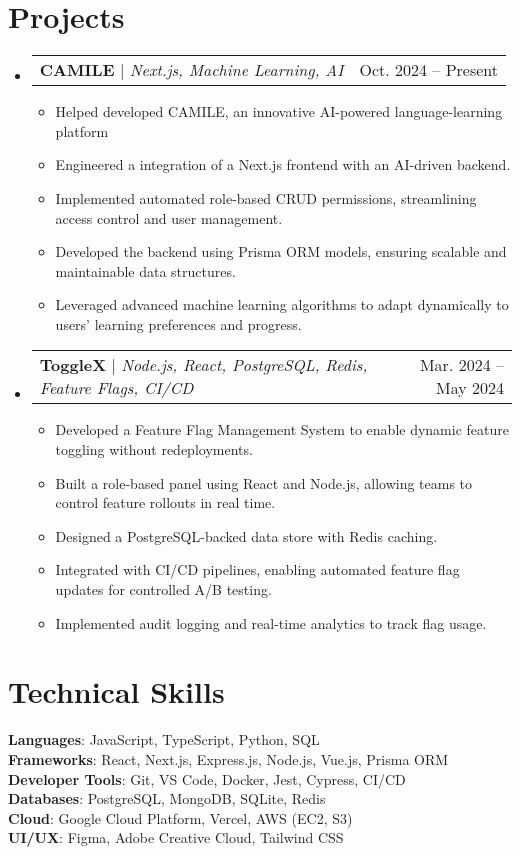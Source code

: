 \documentclass[letterpaper,11pt]{article}
\makeatletter
\newcommand{\resumeItem}[1]{
  \item\small{
    {#1 \vspace{-2pt}}
  }
}
\newcommand{\resumeProjectHeading}[2]{
    \item
    \begin{tabular*}{0.97\textwidth}{l@{\extracolsep{\fill}}r}
      \small#1 & #2 \\
    \end{tabular*}\vspace{-7pt}
}
\newcommand{\resumeItemListStart}{\begin{itemize}}
\newcommand{\resumeItemListEnd}{\end{itemize}\vspace{-5pt}}
\makeatother
\begin{document}
\section{Projects}
  \begin{itemize}[leftmargin=0.15in, label={}]
\resumeProjectHeading
  {\textbf{CAMILE} $|$ \emph{Next.js, Machine Learning, AI}}{Oct. 2024 -- Present}
  \resumeItemListStart
    \resumeItem{Helped developed CAMILE, an innovative AI-powered language-learning platform}
    \resumeItem{Engineered a integration of a Next.js frontend with an AI-driven backend.}
    \resumeItem{Implemented automated role-based CRUD permissions, streamlining access control and user management.}
    \resumeItem{Developed the backend using Prisma ORM models, ensuring scalable and maintainable data structures.}
    \resumeItem{Leveraged advanced machine learning algorithms to adapt dynamically to users’ learning preferences and progress.}
  \resumeItemListEnd

   \resumeProjectHeading
  {\textbf{ToggleX} $|$ \emph{Node.js, React, PostgreSQL, Redis, Feature Flags, CI/CD}}{Mar. 2024 -- May 2024}
  \resumeItemListStart
    \resumeItem{Developed a Feature Flag Management System to enable dynamic feature toggling without redeployments.}
    \resumeItem{Built a role-based panel using React and Node.js, allowing teams to control feature rollouts in real time.}
    \resumeItem{Designed a PostgreSQL-backed data store with Redis caching.}
    \resumeItem{Integrated with CI/CD pipelines, enabling automated feature flag updates for controlled A/B testing.}
    \resumeItem{Implemented audit logging and real-time analytics to track flag usage.}
  \resumeItemListEnd
  \end{itemize}

\section{Technical Skills}
 \begin{itemize}[leftmargin=0.15in, label={}]
    \small{\item{
     \textbf{Languages}{: JavaScript, TypeScript, Python, SQL} \\
     \textbf{Frameworks}{: React, Next.js, Express.js, Node.js, Vue.js, Prisma ORM} \\
     \textbf{Developer Tools}{: Git, VS Code, Docker, Jest, Cypress, CI/CD} \\
     \textbf{Databases}{: PostgreSQL, MongoDB, SQLite, Redis} \\
     \textbf{Cloud}{: Google Cloud Platform, Vercel, AWS (EC2, S3)} \\
     \textbf{UI/UX}{: Figma, Adobe Creative Cloud, Tailwind CSS} \\
    }}
 \end{itemize}


\end{document}

